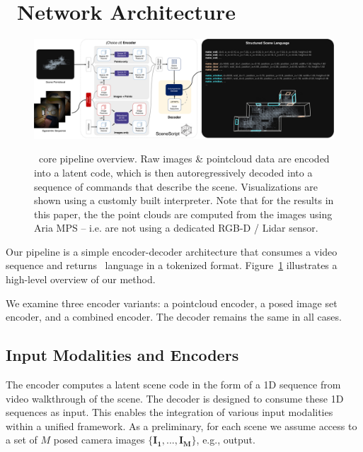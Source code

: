 \section{\METHOD~Network Architecture}
\label{section:method}

\begin{figure}[t]
    \centering
    \includegraphics[width=\textwidth]{figs/alt_method_fig.pdf}\\[-3mm]
    \caption{\METHOD~core pipeline overview. Raw images \& pointcloud data are encoded into a latent code, which is then autoregressively decoded into a sequence of commands that describe the scene. 
    Visualizations are shown using a customly built interpreter. Note that for the results in this paper, the the point clouds are computed from the images using Aria MPS \cite{aria_white_paper} -- i.e. are not using a dedicated RGB-D / Lidar sensor.}
    \label{fig:main_pipeline}
\end{figure}

Our pipeline is a simple encoder-decoder architecture that consumes a video sequence and returns \METHOD~language in a tokenized format. Figure~\ref{fig:main_pipeline} illustrates a high-level overview of our method.

We examine three encoder variants: a pointcloud encoder, a posed image set encoder, and a combined encoder. The decoder remains the same in all cases.  


\subsection{Input Modalities and Encoders}
\label{sec:encoders}
%
The encoder computes a latent scene code
in the form of a 1D sequence
from video walkthrough of the scene.
The decoder is designed
to consume these 1D sequences as input.
This enables the integration of various input modalities
within a unified framework.
As a preliminary,
for each scene we assume access to
a set of $M$ posed camera images
$\{\mathbf{I_1},...,\mathbf{I_M}\}$, 
e.g., \SLAM{} output. 

